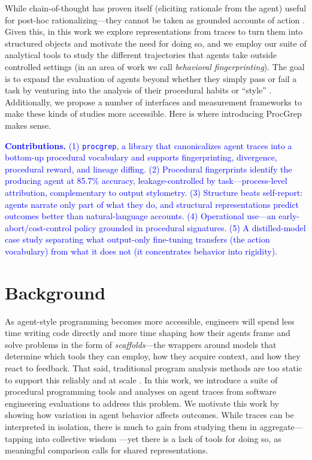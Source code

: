 \documentclass[12pt]{article}
\begin{document}
While chain-of-thought has proven itself (eliciting rationale from the agent) useful for post-hoc rationalizing---they cannot be taken as grounded accounts of action \cite{wei2023chainofthoughtpromptingelicitsreasoning, ross2025modelingstudentlearning38, guan2025monitoringmonitorability}. Given this, in this work we explore representations from traces to turn them into structured objects and motivate the need for doing so, and we employ our suite of analytical tools to study the different trajectories that agents take outside controlled settings (in an area of work we call \emph{behavioral fingerprinting}). The goal is to expand the evaluation of agents beyond whether they simply pass or fail a task by venturing into the analysis of their procedural habits or ``style'' \cite{bisztray2025iknowllmwrote}. Additionally, we propose a number of interfaces and measurement frameworks to make these kinds of studies more accessible. Here is where introducing ProcGrep makes sense.

\textcolor{blue}{\textbf{Contributions.} (1) \texttt{procgrep}, a library that canonicalizes agent traces into a bottom-up procedural vocabulary and supports fingerprinting, divergence, procedural reward, and lineage diffing. (2) Procedural fingerprints identify the producing agent at 85.7\% accuracy, leakage-controlled by task---process-level attribution, complementary to output stylometry. (3) Structure beats self-report: agents narrate only part of what they do, and structural representations predict outcomes better than natural-language accounts. (4) Operational use---an early-abort/cost-control policy grounded in procedural signatures. (5) A distilled-model case study separating what output-only fine-tuning transfers (the action vocabulary) from what it does not (it concentrates behavior into rigidity).}

\section{Background}
As agent-style programming becomes more accessible, engineers will spend less time writing code directly and more time shaping how their agents frame and solve problems in the form of \emph{scaffolds}---the wrappers around models that determine which tools they can employ, how they acquire context, and how they react to feedback. That said, traditional program analysis methods are too static to support this reliably and at scale \cite{jimenez2024swebenchlanguagemodelsresolve, yang2024sweagentagentcomputerinterfacesenable, chen2021evaluatinglargelanguagemodels, austin2021programsynthesislargelanguage}. In this work, we introduce a suite of procedural programming tools and analyses on agent traces from software engineering evaluations to address this problem. We motivate this work by showing how variation in agent behavior affects outcomes. While traces can be interpreted in isolation, there is much to gain from studying them in aggregate---tapping into collective wisdom \cite{surowiecki2004wisdom, Alizadeh_2015}---yet there is a lack of tools for doing so, as meaningful comparison calls for shared representations.
\end{document}
